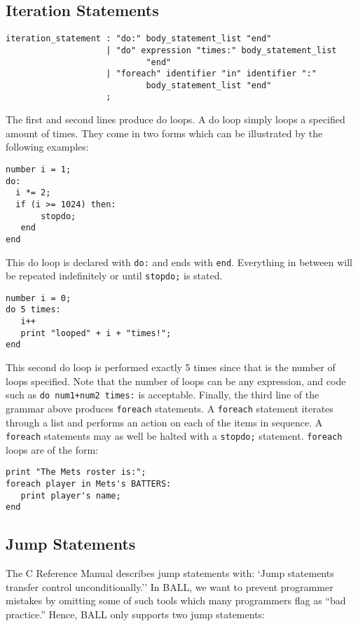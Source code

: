 \subsection{Iteration Statements}

\begin{verbatim}
iteration_statement : "do:" body_statement_list "end"
                    | "do" expression "times:" body_statement_list
                            "end"
                    | "foreach" identifier "in" identifier ":"
                            body_statement_list "end"
                    ;
\end{verbatim}

The first and second lines produce do loops. A do loop simply loops a
specified amount of times. They 
come in two forms which can be illustrated by the following examples: 

\begin{verbatim}
number i = 1;
do:
  i *= 2;
  if (i >= 1024) then:
       stopdo;
   end
end
\end{verbatim}

This do loop is declared with \texttt{do:} and ends with
\texttt{end}. Everything in between will be repeated indefinitely or
until \texttt{stopdo;} is stated.

\begin{verbatim}
number i = 0;
do 5 times:
   i++
   print "looped" + i + "times!";
end
\end{verbatim}

This second do loop is performed exactly 5 times since that is the
number of loops specified. Note that the number of loops can be any
expression, and code such as \texttt{do num1+num2 times:} is
acceptable.  Finally, the third line of the grammar above produces
\texttt{foreach} statements. A \texttt{foreach} statement iterates
through a list and performs an action on each of the items in
sequence. A \texttt{foreach} statements may as well be halted with a
\texttt{stopdo;} statement. \texttt{foreach} loops are of the form:

\begin{verbatim}
print "The Mets roster is:";
foreach player in Mets's BATTERS:
   print player's name;
end
\end{verbatim}
 
 \subsection{Jump Statements}
The C Reference Manual describes jump statements with: `Jump
statements transfer control unconditionally.'' In BALL, we want to
prevent programmer mistakes by omitting some of such tools which many
programmers flag as ``bad practice.'' Hence, BALL only supports two
jump statements:


